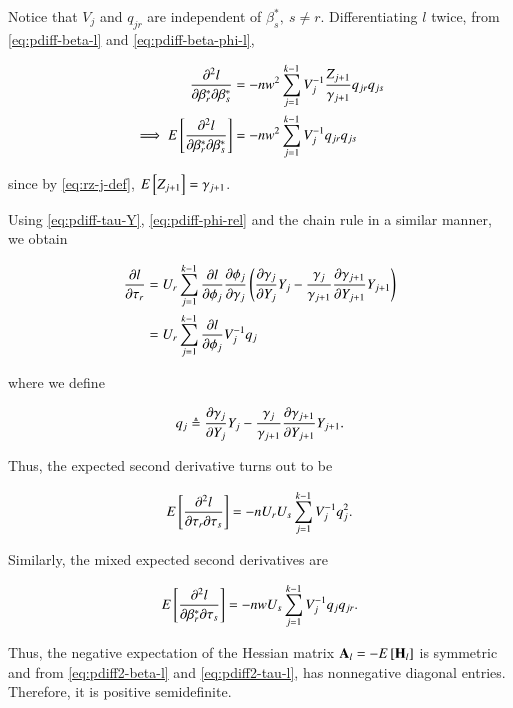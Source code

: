 \documentclass[journal,12pt,twocolumn]{IEEEtran}
\begin{document}
Notice that \(V_j\) and \(q_{jr}\) are independent of \(\beta^*_s,\ s \neq r\).
Differentiating \(l\) twice, from \eqref{eq:pdiff-beta-l} and
\eqref{eq:pdiff-beta-phi-l},

\begin{align}
     \frac{\partial^2l}{\partial \beta_r^* \partial \beta_s^*} &= -nw^2\sum_{j=1}^{k-1}V_j^{-1}\frac{Z_{j+1}}{\gamma_{j+1}}q_{jr}q_{js} \\
     \implies \mean{\frac{\partial^2l}{\partial \beta_r^* \partial \beta_s^*}} &= -nw^2\sum_{j=1}^{k-1}V_j^{-1}q_{jr}q_{js}
     \label{eq:pdiff2-beta-l}
\end{align}

since by \eqref{eq:rz-j-def}, \(E\left[ Z_{j+1} \right] = \gamma_{j+1}\).

Using \eqref{eq:pdiff-tau-Y}, \eqref{eq:pdiff-phi-rel} and the chain rule in a
similar manner, we obtain

\begin{align}
     \pdiff{\tau_r}{l} &= U_r\sum_{j=1}^{k-1}\pdiff{\phi_j}{l}\pdiff{\gamma_j}{\phi_j}\brak{\pdiff{Y_j}{\gamma_j}Y_j - \frac{\gamma_j}{\gamma_{j+1}}\pdiff{Y_{j+1}}{\gamma_{j+1}}Y_{j+1}} \\
                       &= U_r\sum_{j=1}^{k-1}\pdiff{\phi_j}{l}V_j^{-1}q_j
                       \label{eq:pdiff-tau-l}
\end{align}

where we define

\begin{equation}
     q_j \triangleq \pdiff{Y_j}{\gamma_j}Y_j - \frac{\gamma_j}{\gamma_{j+1}}\pdiff{Y_{j+1}}{\gamma_{j+1}}Y_{j+1}.
     \label{eq:qj-def}
\end{equation}

Thus, the expected second derivative turns out to be

\begin{equation}
     \mean{\frac{\partial^2l}{\partial \tau_r \partial \tau_s}} = -nU_rU_s\sum_{j=1}^{k-1}V_j^{-1}q_j^2.
     \label{eq:pdiff2-tau-l}
\end{equation}

Similarly, the mixed expected second derivatives are

\begin{equation}
     \mean{\frac{\partial^2l}{\partial \beta_r^* \partial \tau_s}} = -nwU_s\sum_{j=1}^{k-1}V_j^{-1}q_jq_{jr}.
     \label{eq:pdiff2-beta-tau}
\end{equation}

Thus, the negative expectation of the Hessian matrix \(\boldsymbol{\mathbf{A}}_l =
-E\left[ \boldsymbol{\mathbf{H}}_l \right]\) is symmetric and from \eqref{eq:pdiff2-beta-l} and
\eqref{eq:pdiff2-tau-l}, has nonnegative diagonal entries. Therefore, it is
positive semidefinite.
\end{document}
